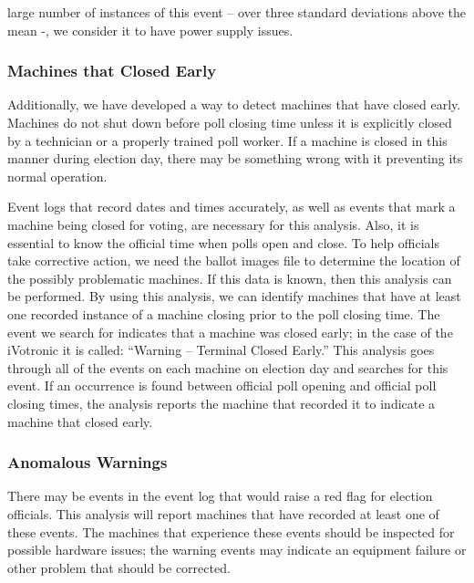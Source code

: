 large number of instances of this event – over three standard deviations above the mean -, we consider it to have power supply issues.    

\subsubsection{Machines that Closed Early}
Additionally, we have developed a way to detect machines that have closed early. Machines do not shut down before poll closing time unless it is explicitly closed by a technician or a properly trained poll worker. If a machine is closed in this manner during election day, there may be something wrong with it preventing its normal operation.
                  
Event logs that record dates and times accurately, as well as events that mark a machine being closed for voting, are necessary for this analysis. Also, it is essential to know the official time when polls open and close. To help officials take corrective action, we need the ballot images file to determine the location of the possibly problematic machines.  If this data is known, then this analysis can be performed. By using this analysis, we can identify machines that have at least one recorded instance of a machine closing prior to the poll closing time. The event we search for indicates that a machine was closed early; in the case of the iVotronic it is called: \textquotedblleft Warning – Terminal Closed Early.\textquotedblright \hspace{2 mm} This analysis goes through all of the events on each machine on election day and searches for this event. If an occurrence is found between official poll opening and official poll closing times, the analysis reports the machine that recorded it to indicate a machine that closed early.  
        
\subsubsection{Anomalous Warnings}
There may be events in the event log that would raise a red flag for election officials. This analysis will report machines that have recorded at least one of these events. The machines that experience these events should be inspected for possible hardware issues; the warning events may indicate an equipment failure or other problem that should be corrected.

